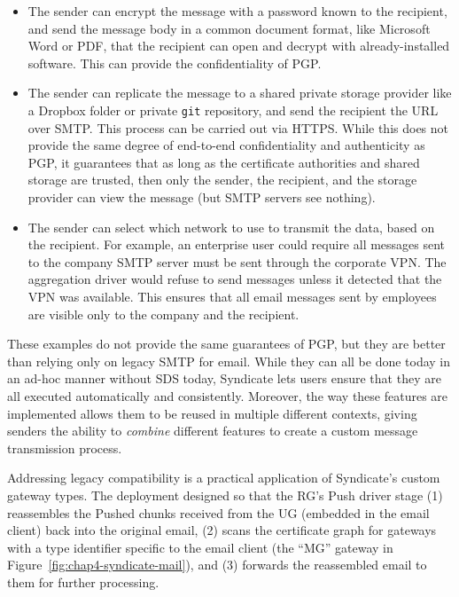 \begin{itemize}
\item The sender can encrypt the message with a password known to the recipient,
and send the message body in a common document format, like Microsoft Word or
PDF, that the recipient can open and decrypt with already-installed software.
This can provide the confidentiality of PGP.
\item The sender can replicate the message to a shared private storage provider
like a Dropbox folder or private \texttt{git} repository, and send the
recipient the URL over SMTP.  This process can be carried out via HTTPS.
While this does not provide the same
degree of end-to-end confidentiality and authenticity as PGP, it guarantees that as long as
the certificate authorities and shared storage are trusted, then only the sender, the recipient, and the
storage provider can view the message (but SMTP servers see nothing).
\item The sender can select which network to use to transmit the data, based on
the recipient.  For example, an enterprise user could require all messages sent
to the company SMTP server must be sent through the corporate
VPN.  The aggregation driver would refuse to send messages unless it detected
that the VPN was available.  This ensures that all email messages sent by employees are
visible only to the company and the recipient.
\end{itemize}

These examples do not provide the same guarantees of PGP, but they are
better than relying only on legacy SMTP for email.  While they can all be done
today in an ad-hoc manner without SDS today,
Syndicate lets users ensure that they are all executed
automatically and consistently.  Moreover, the way these features are
implemented allows them to be reused in multiple different contexts, giving senders the
ability to \emph{combine} different features to create a custom message
transmission process.

Addressing legacy compatibility is a practical application of Syndicate's custom
gateway types.  The deployment designed so that the RG's
Push driver stage (1) reassembles the Pushed chunks received from the UG
(embedded in the email client) back into the original email, (2)
scans the certificate graph for gateways with a type identifier specific to the
email client (the ``MG'' gateway in Figure~\ref{fig:chap4-syndicate-mail}),
and (3) forwards the reassembled email to them for further
processing.

